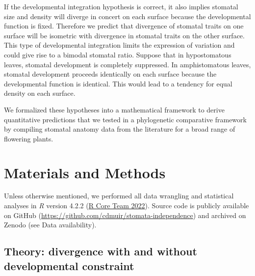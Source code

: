 \documentclass[
  12pt,
]{article}
\begin{document}

If the developmental integration hypothesis is correct, it also implies stomatal size and density will diverge in concert on each surface because the developmental function is fixed. Therefore we predict that divergence of stomatal traits on one surface will be isometric with divergence in stomatal traits on the other surface. This type of developmental integration limits the expression of variation and could give rise to a bimodal stomatal ratio. Suppose that in hypostomatous leaves, stomatal development is completely suppressed. In amphistomatous leaves, stomatal development proceeds identically on each surface because the developmental function is identical. This would lead to a tendency for equal density on each surface.

We formalized these hypotheses into a mathematical framework to derive quantitative predictions that we tested in a phylogenetic comparative framework by compiling stomatal anatomy data from the literature for a broad range of flowering plants.

\hypertarget{materials-and-methods}{%
\section{Materials and Methods}\label{materials-and-methods}}

Unless otherwise mentioned, we performed all data wrangling and statistical analyses in \emph{R} version 4.2.2 (\protect\hyperlink{ref-r_core_team_r:_2022}{R Core Team 2022}). Source code is publicly available on GitHub (\url{https://github.com/cdmuir/stomata-independence}) and archived on Zenodo (see Data availability).

\hypertarget{theory-divergence-with-and-without-developmental-constraint}{%
\subsection{Theory: divergence with and without developmental constraint}\label{theory-divergence-with-and-without-developmental-constraint}}
\end{document}
